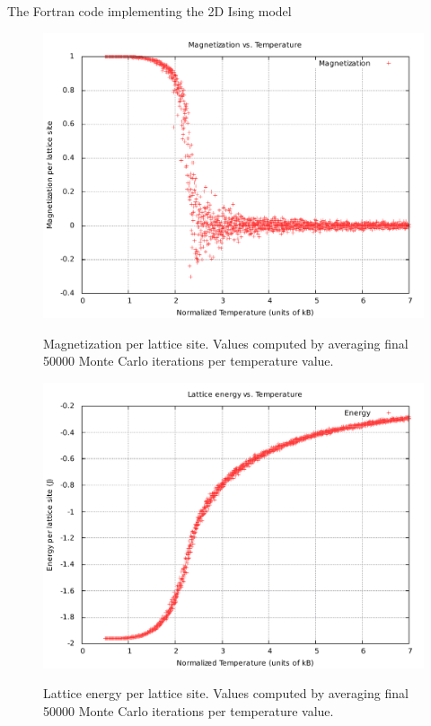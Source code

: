\documentclass[]{article}
\begin{document}
The Fortran code implementing the 2D Ising model

\begin{figure}[ht!]
 \centering
 \includegraphics[width=\linewidth]{figures/mag_vs_temp.pdf}
 \label{fig:mag_vs_temp}
 \caption{Magnetization per lattice site. Values computed by averaging final 50000 Monte Carlo iterations per temperature value.}
\end{figure}

\begin{figure}[ht!]
 \centering
 \includegraphics[width=\linewidth]{figures/energy_vs_temp.pdf}
 \label{fig:mag_vs_temp}
 \caption{Lattice energy per lattice site. Values computed by averaging final 50000 Monte Carlo iterations per temperature value.}
\end{figure}
\end{document}
